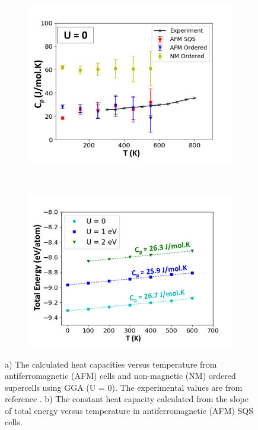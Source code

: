 \documentclass[preprint,12pt]{elsarticle}
\begin{document}
\begin{figure}[h!]
    \centering
    \begin{subfigure}[]{0.48\textwidth}
    \centering
    \includegraphics[width=\textwidth]{cp_u0.jpg}
    \caption{}
    \label{fig:2}
    \end{subfigure}
    ~
    \begin{subfigure}[]{0.48\textwidth}
    \centering
    \includegraphics[width=\textwidth]{etot_sqs.jpg}
    \caption{}
    \label{fig:heat_cap_afm}
\end{subfigure}
    \caption{a) The calculated heat capacities versus temperature from antiferromagnetic (AFM) cells and non-magnetic (NM) ordered supercells using GGA (U = 0). The experimental values are from reference \cite{takahashi_heat_1989}. b) The constant heat capacity calculated from the slope of total energy versus temperature in antiferromagnetic (AFM) SQS cells. }
\end{figure}
\end{document}
